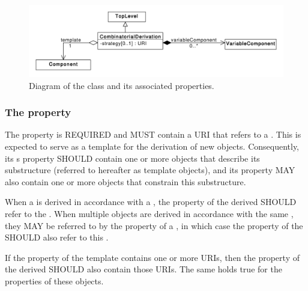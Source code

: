 \begin{figure}[ht]
\begin{center}
\includegraphics[scale=0.6]{uml/combinatorial_derivation}
\caption[]{Diagram of the  class and its associated properties.}
\label{uml:combinatorial_derivation}
\end{center}
\end{figure}

\subsubsection*{ The  property}\label{sec:template}

The  property is REQUIRED and MUST contain a URI that refers to a . 
This  is expected to serve as a template for the derivation of new  objects. 
Consequently, its s property SHOULD contain one or more  objects that describe its substructure (referred to hereafter as template  objects), and its  property MAY also contain one or more  objects that constrain this substructure.

When a  is derived in accordance with a , the  property of the derived  SHOULD refer to the . When multiple  objects are derived in accordance with the same , they MAY be referred to by the  property of a , in which case the  property of the  SHOULD also refer to this .

If the  property of the template  contains one or more URIs, then the  property of the derived  SHOULD also contain those URIs. The same holds true for the  properties of these  objects.

